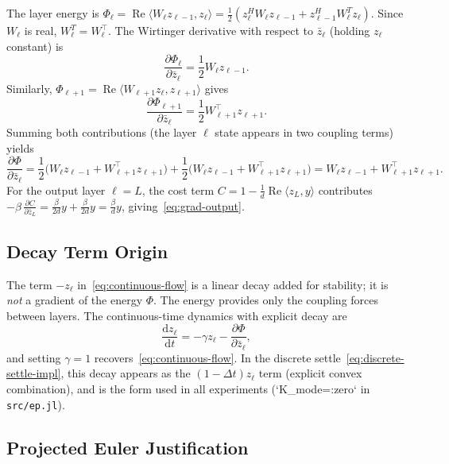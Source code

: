\documentclass[11pt]{article}
\newcommand{\dd}{\mathrm{d}}
\newcommand{\dt}{\Delta t}
\DeclareMathOperator{\Real}{Re}
\begin{document}
The layer energy is $\Phi_\ell = \Real\langle W_\ell z_{\ell-1}, z_\ell \rangle = \frac{1}{2}(z_\ell^H W_\ell z_{\ell-1} + z_{\ell-1}^H W_\ell^T z_\ell)$. Since $W_\ell$ is real, $W_\ell^T = W_\ell^\top$. The Wirtinger derivative with respect to $\bar{z}_\ell$ (holding $z_\ell$ constant) is
\begin{equation}
\frac{\partial \Phi_\ell}{\partial \bar{z}_\ell} = \frac{1}{2} W_\ell z_{\ell-1}.
\end{equation}
Similarly, $\Phi_{\ell+1} = \Real\langle W_{\ell+1} z_\ell, z_{\ell+1} \rangle$ gives
\begin{equation}
\frac{\partial \Phi_{\ell+1}}{\partial \bar{z}_\ell} = \frac{1}{2} W_{\ell+1}^\top z_{\ell+1}.
\end{equation}
Summing both contributions (the layer $\ell$ state appears in two coupling terms) yields
\begin{equation}
\frac{\partial \Phi}{\partial \bar{z}_\ell} = \frac{1}{2}\big( W_\ell z_{\ell-1} + W_{\ell+1}^\top z_{\ell+1} \big) + \frac{1}{2}\big( W_\ell z_{\ell-1} + W_{\ell+1}^\top z_{\ell+1} \big) = W_\ell z_{\ell-1} + W_{\ell+1}^\top z_{\ell+1}.
\end{equation}
For the output layer $\ell=L$, the cost term $C = 1 - \frac{1}{d}\Real\langle z_L, y \rangle$ contributes $-\beta\, \frac{\partial C}{\partial \bar{z}_L} = \frac{\beta}{2d} y + \frac{\beta}{2d} y = \frac{\beta}{d} y$, giving~\eqref{eq:grad-output}.

\subsection{Decay Term Origin}

The term $-z_\ell$ in~\eqref{eq:continuous-flow} is a linear decay added for stability; it is \emph{not} a gradient of the energy $\Phi$. The energy provides only the coupling forces between layers. The continuous-time dynamics with explicit decay are
\begin{equation}
\frac{\dd z_\ell}{\dd t} = -\gamma z_\ell - \frac{\partial \Phi}{\partial \bar{z}_\ell},
\end{equation}
and setting $\gamma = 1$ recovers~\eqref{eq:continuous-flow}. In the discrete settle~\eqref{eq:discrete-settle-impl}, this decay appears as the $(1-\dt)z_\ell$ term (explicit convex combination), and is the form used in all experiments (`K_mode=:zero` in \texttt{src/ep.jl}).

\subsection{Projected Euler Justification}
\end{document}
